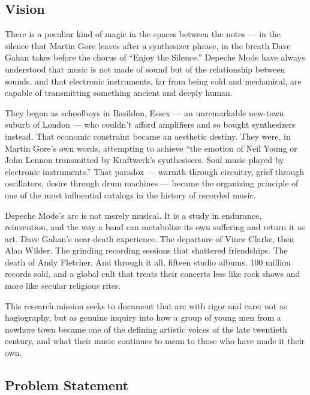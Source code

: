 \documentclass[11pt,letterpaper]{article}
\begin{document}
\subsection{Vision}

There is a peculiar kind of magic in the spaces between the notes --- in the silence that Martin Gore leaves after a synthesizer phrase, in the breath Dave Gahan takes before the chorus of ``Enjoy the Silence.'' Depeche Mode have always understood that music is not made of sound but of the relationship between sounds, and that electronic instruments, far from being cold and mechanical, are capable of transmitting something ancient and deeply human.

They began as schoolboys in Basildon, Essex --- an unremarkable new-town suburb of London --- who couldn't afford amplifiers and so bought synthesizers instead. That economic constraint became an aesthetic destiny. They were, in Martin Gore's own words, attempting to achieve ``the emotion of Neil Young or John Lennon transmitted by Kraftwerk's synthesisers. Soul music played by electronic instruments.'' That paradox --- warmth through circuitry, grief through oscillators, desire through drum machines --- became the organizing principle of one of the most influential catalogs in the history of recorded music.

Depeche Mode's arc is not merely musical. It is a study in endurance, reinvention, and the way a band can metabolize its own suffering and return it as art. Dave Gahan's near-death experience. The departure of Vince Clarke, then Alan Wilder. The grinding recording sessions that shattered friendships. The death of Andy Fletcher. And through it all, fifteen studio albums, 100 million records sold, and a global cult that treats their concerts less like rock shows and more like secular religious rites.

This research mission seeks to document that arc with rigor and care: not as hagiography, but as genuine inquiry into how a group of young men from a nowhere town became one of the defining artistic voices of the late twentieth century, and what their music continues to mean to those who have made it their own.

\subsection{Problem Statement}
\end{document}
